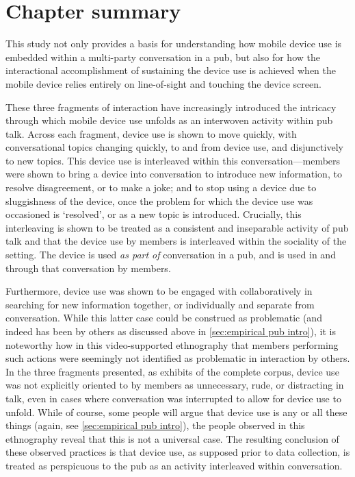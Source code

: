 \section{Chapter summary}\label{sec:empirical pub summary}
\begin{revisedsubmission}
This study not only provides a basis for understanding how mobile device use is embedded within a multi-party conversation in a pub, but also for how the interactional accomplishment of sustaining the device use is achieved when the mobile device relies entirely on line-of-sight and touching the device screen.

These three fragments of interaction have increasingly introduced the intricacy through which mobile device use unfolds as an interwoven activity within pub talk.
Across each fragment, device use is shown to move quickly, with conversational topics changing quickly, to and from device use, and disjunctively to new topics.
This device use is interleaved within this conversation---members were shown to bring a device into conversation to introduce new information, to resolve disagreement, or to make a joke; and to stop using a device due to sluggishness of the device, once the problem for which the device use was occasioned is `resolved', or as a new topic is introduced.
Crucially, this interleaving is shown to be treated as a consistent and inseparable activity of pub talk and that the device use by members is interleaved within the sociality of the setting.
The device is used \textit{as part of} conversation in a pub, and is used in and through that conversation by members.

Furthermore, device use was shown to be engaged with collaboratively in searching for new information together, or  individually and separate from conversation.
While this latter case could be construed as problematic (and indeed has been by others as discussed above in \ref{sec:empirical pub intro}), it is noteworthy how in this video-supported ethnography that members performing such actions were seemingly not identified as problematic in interaction by others.
In the three fragments presented, as exhibits of the complete corpus, device use was not explicitly oriented to by members as unnecessary, rude, or distracting in talk, even in cases where conversation was interrupted to allow for device use to unfold.
While of course, some people will argue that device use is any or all these things (again, see \ref{sec:empirical pub intro}), the people observed in this ethnography reveal that this is not a universal case.
The resulting conclusion of these observed practices is that device use, as supposed prior to data collection, is treated as perspicuous to the pub as an activity interleaved within conversation.


\end{revisedsubmission}
